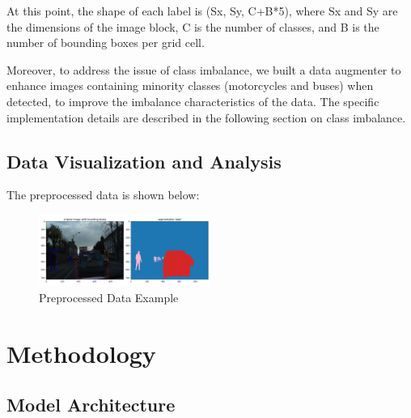\documentclass[conference]{IEEEtran}
\begin{document}

At this point, the shape of each label is (Sx, Sy, C+B*5), where Sx and Sy are the dimensions of the image block, C is the number of classes, and B is the number of bounding boxes per grid cell.



Moreover, to address the issue of class imbalance, we built a data augmenter to enhance images containing minority classes (motorcycles and buses) when detected, to improve the imbalance characteristics of the data. The specific implementation details are described in the following section on class imbalance.

\subsection{Data Visualization and Analysis}

The preprocessed data is shown below:

\begin{figure}[htbp]
    \centerline{\includegraphics[width=0.5\textwidth]{fig/data.png}}
    \caption{Preprocessed Data Example}
    \label{fig:data}
\end{figure}


\section{Methodology}
\subsection{Model Architecture}

\end{document}
